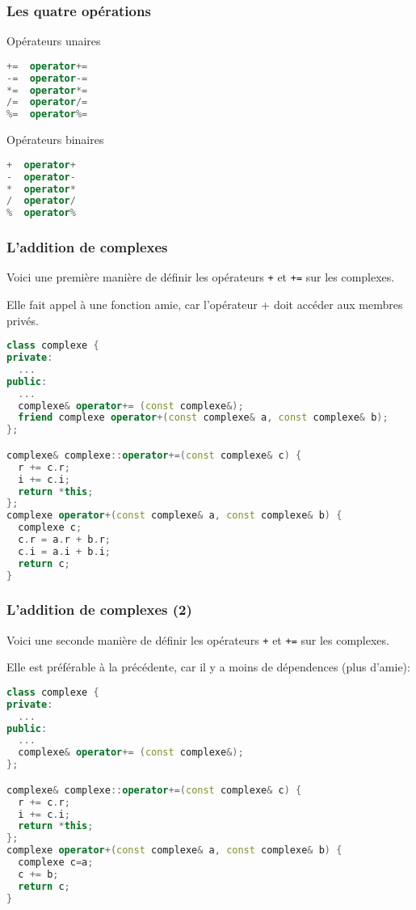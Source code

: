 \documentclass{beamer}
\begin{document}
\begin{frame}[fragile=singleslide,shrink=20]
\frametitle {Les quatre opérations}

\begin{block}{Opérateurs unaires}
\begin{lstlisting}[language=c++]
+=  operator+=
-=  operator-=
*=  operator*=
/=  operator/=
%=  operator%=
\end{lstlisting}
\end{block}

\begin{block}{Opérateurs binaires}
\begin{lstlisting}[language=c++]
+  operator+
-  operator-
*  operator*
/  operator/
%  operator%
\end{lstlisting}
\end{block}
\end{frame}

\begin{frame}[fragile=singleslide,shrink=20]
\frametitle {L'addition de complexes}

Voici une première manière de définir les opérateurs \texttt{+} et \texttt{+=} sur les complexes.

Elle fait appel à une fonction amie, car l'opérateur + doit accéder aux membres privés.
\begin{lstlisting}[language=c++]
class complexe {
private:
  ...
public:
  ...
  complexe& operator+= (const complexe&);
  friend complexe operator+(const complexe& a, const complexe& b);
};

complexe& complexe::operator+=(const complexe& c) {
  r += c.r;
  i += c.i;
  return *this;
};
complexe operator+(const complexe& a, const complexe& b) {
  complexe c;
  c.r = a.r + b.r;
  c.i = a.i + b.i;
  return c;
}
\end{lstlisting}
\end{frame}

\begin{frame}[fragile=singleslide,shrink=20]
\frametitle {L'addition de complexes (2)}

Voici une seconde manière de définir les opérateurs \texttt{+} et \texttt{+=} sur les complexes.

Elle est préférable à la précédente, car il y a moins de dépendences (plus d'amie):
\begin{lstlisting}[language=c++]
class complexe {
private:
  ...
public:
  ...
  complexe& operator+= (const complexe&);
};

complexe& complexe::operator+=(const complexe& c) {
  r += c.r;
  i += c.i;
  return *this;
};
complexe operator+(const complexe& a, const complexe& b) {
  complexe c=a;
  c += b;
  return c;
}
\end{lstlisting}
\end{frame}
\end{document}
